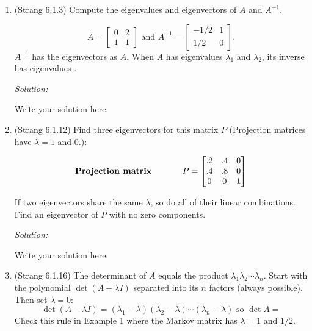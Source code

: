 \documentclass[11pt]{article}
\newenvironment{sol}
    {\emph{Solution:}
    }
\newcommand{\headings}{
\large{\textbf{YOUR NAME GOES HERE \hfill 21-241 Fall 2019}\\
\textbf{Homework 8 \hfill Due Friday, October 25}}\\
\rule[0.1in]{\textwidth}{0.01in}
}
\begin{document}
\headings

\begin{enumerate}
\section*{Required Problems}


\item (Strang 6.1.3) Compute the eigenvalues and eigenvectors of $A$ and $A^{-1}$. %

\[ A = \begin{bmatrix} 0 & 2 \\ 1 & 1 \end{bmatrix} \text{ and } A^{-1} = \begin{bmatrix} -1/2 & 1 \\ 1/2 & 0 \end{bmatrix}.\]
$A^{-1}$ has the \hspace{1in} eigenvectors as $A$.  When $A$ has eigenvalues $\lambda_1$ and $\lambda_2$, its inverse has eigenvalues \hspace{1in}.


 \begin{sol}
Write your solution here.
\end{sol}
\clearpage


\item (Strang 6.1.12) Find three eigenvectors for this matrix $P$ (Projection matrices have $\lambda = 1$ and $0$.):

\[\textbf{Projection matrix} \hspace{.5in} P = \begin{bmatrix} .2 & .4 & 0 \\ .4 & .8 & 0 \\ 0 & 0 & 1  \end{bmatrix}\]

If two eigenvectors share the same $\lambda$, so do all of their linear combinations.  Find an eigenvector of $P$ with no zero components.


 \begin{sol}
Write your solution here.
\end{sol}
\clearpage

\item (Strang 6.1.16) The determinant of $A$ equals the product $\lambda_1\lambda_2 \cdots \lambda_n$.  Start with the polynomial $\det(A-\lambda I)$ separated into its $n$ factors (always possible). Then set $\lambda = 0$:
\[\det (A - \lambda I) = (\lambda_1 - \lambda)(\lambda_2 - \lambda) \cdots (\lambda_n - \lambda) \text{ so } \det A = \]
Check this rule in Example 1 where the Markov matrix has $\lambda = 1$ and $1/2$.



\end{enumerate}
\end{document}
